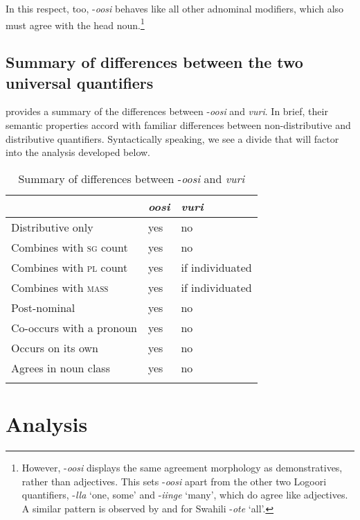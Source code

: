 \documentclass[output=paper]{langsci/langscibook}
\begin{document}
In this respect, too, -\textit{oosi} behaves like all other adnominal modifiers, which also must agree with the head noun.\footnote{However, -\textit{oosi} displays the same agreement morphology as demonstratives, rather than adjectives. This sets -\textit{oosi} apart from the other two Logoori quantifiers, -\textit{lla} ‘one, some’ and -\textit{iinge} ‘many’, which do agree like adjectives. A similar pattern is observed by \citet{Krifka1995} and \citet{ZerbianKrifka2008} for Swahili -\textit{ote} ‘all’.
} 

\subsection{Summary of differences between the two universal quantifiers}

 provides a summary of the differences between -\textit{oosi} and \textit{vuri}. In brief, their semantic properties accord with familiar differences between non-distributive and distributive quantifiers. Syntactically speaking, we see a divide that will factor into the analysis developed below.

\begin{table}
\caption{Summary of differences between -\textit{oosi} and \textit{vuri}}
\label{tab:2}


\begin{tabularx}{\textwidth}{p{5cm}XX} 
\lsptoprule
& \textit{oosi} &   \textit{vuri}\\
\midrule
{Distributive only}& yes   & no \\
{Combines with \textsc{sg} count}& yes   &  no\\
{Combines with \textsc{pl} count}& yes   & if individuated\\
{Combines with \textsc{mass}}& yes   & if individuated\\
Post-nominal& yes   & no \\
Co-occurs with a pronoun& yes   & no \\
Occurs on its own& yes   & no \\
Agrees in noun class & yes   & no  \\
\lspbottomrule
\end{tabularx}
\end{table}

\section{Analysis}\label{sec:landman:3}
\end{document}
